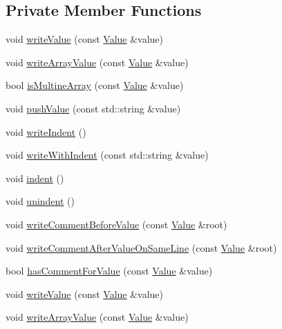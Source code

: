 \subsection*{Private Member Functions}
\begin{DoxyCompactItemize}
\item 
void \hyperlink{classJson_1_1StyledWriter_ac40143cf43f7c4a94d3d0b41e5245069}{write\-Value} (const \hyperlink{classJson_1_1Value}{Value} \&value)
\item 
void \hyperlink{classJson_1_1StyledWriter_a0618c23d62965515def15ece1e677f5d}{write\-Array\-Value} (const \hyperlink{classJson_1_1Value}{Value} \&value)
\item 
bool \hyperlink{classJson_1_1StyledWriter_aa5dc671edf10b9976f1511da2271ab9d}{is\-Multine\-Array} (const \hyperlink{classJson_1_1Value}{Value} \&value)
\item 
void \hyperlink{classJson_1_1StyledWriter_aba120a1ff1b84411b32039188e8fb49f}{push\-Value} (const std\-::string \&value)
\item 
void \hyperlink{classJson_1_1StyledWriter_a885f4bfb5701896d60eee6716d2db7e4}{write\-Indent} ()
\item 
void \hyperlink{classJson_1_1StyledWriter_a7b3cc9da3cb455ee9b2752307ac21b58}{write\-With\-Indent} (const std\-::string \&value)
\item 
void \hyperlink{classJson_1_1StyledWriter_a0b65be6186a7c6638270990265e42b97}{indent} ()
\item 
void \hyperlink{classJson_1_1StyledWriter_acee1c9285519b573cfcb00b7e7f5a809}{unindent} ()
\item 
void \hyperlink{classJson_1_1StyledWriter_ad3452c48fabf968bf3693549331ec06e}{write\-Comment\-Before\-Value} (const \hyperlink{classJson_1_1Value}{Value} \&root)
\item 
void \hyperlink{classJson_1_1StyledWriter_ab12b274c62822fc51ec4617c6be95139}{write\-Comment\-After\-Value\-On\-Same\-Line} (const \hyperlink{classJson_1_1Value}{Value} \&root)
\item 
bool \hyperlink{classJson_1_1StyledWriter_a37a806d010f708cb68556f2666f79bdf}{has\-Comment\-For\-Value} (const \hyperlink{classJson_1_1Value}{Value} \&value)
\item 
void \hyperlink{classJson_1_1StyledWriter_ac40143cf43f7c4a94d3d0b41e5245069}{write\-Value} (const \hyperlink{classJson_1_1Value}{Value} \&value)
\item 
void \hyperlink{classJson_1_1StyledWriter_a0618c23d62965515def15ece1e677f5d}{write\-Array\-Value} (const \hyperlink{classJson_1_1Value}{Value} \&value)

\end{DoxyCompactItemize}
